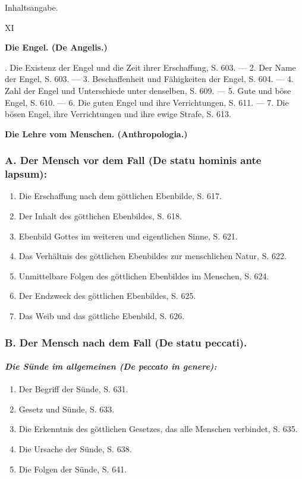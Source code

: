 \centerline{\large Inhaltsangabe.}
\centerline{XI}

\bigskip

\centerline{\textbf{Die Engel. (De Angelis.)}}
. Die Existenz der Engel und die Zeit ihrer Erschaffung, S. 603. --- 2. Der Name der Engel, S. 603. --- 3. Beschaffenheit und Fähigkeiten der Engel, S. 604. --- 4. Zahl der Engel und Unterschiede unter denselben, S. 609. --- 5. Gute und böse Engel, S. 610. --- 6. Die guten Engel und ihre Verrichtungen, S. 611. --- 7. Die bösen Engel, ihre Verrichtungen und ihre ewige Strafe, S. 613.

\bigskip

\centerline{\textbf{Die Lehre vom Menschen. (Anthropologia.)}}

\subsubsection*{\textbf{A. Der Mensch vor dem Fall (De statu hominis ante lapsum):}}
\begin{enumerate}
    \item Die Erschaffung nach dem göttlichen Ebenbilde, S. 617.
    \item Der Inhalt des göttlichen Ebenbildes, S. 618.
    \item Ebenbild Gottes im weiteren und eigentlichen Sinne, S. 621.
    \item Das Verhältnis des göttlichen Ebenbildes zur menschlichen Natur, S. 622.
    \item Unmittelbare Folgen des göttlichen Ebenbildes im Menschen, S. 624.
    \item Der Endzweck des göttlichen Ebenbildes, S. 625.
    \item Das Weib und das göttliche Ebenbild, S. 626.
\end{enumerate}

\subsubsection*{\textbf{B. Der Mensch nach dem Fall (De statu peccati).}}
\paragraph*{\textit{Die Sünde im allgemeinen (De peccato in genere):}}
\begin{enumerate}
    \item Der Begriff der Sünde, S. 631.
    \item Gesetz und Sünde, S. 633.
    \item Die Erkenntnis des göttlichen Gesetzes, das alle Menschen verbindet, S. 635.
    \item Die Ursache der Sünde, S. 638.
    \item Die Folgen der Sünde, S. 641.
\end{enumerate}


